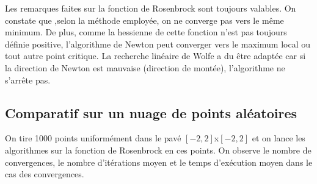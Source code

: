 \documentclass[a4paper,10pt]{article}
\begin{document}
\begin{figure}[h!]
	\centering
\end{figure}

Les remarques faites sur la fonction de Rosenbrock sont toujours valables.
On constate que ,selon la méthode employée, on ne converge pas vers le même minimum.
De plus, comme la hessienne de cette fonction n'est pas toujours définie positive, l'algorithme de Newton peut converger vers le maximum local ou tout autre point critique. 
La recherche linéaire de Wolfe a du être adaptée car si la direction de Newton est mauvaise (direction de montée), l'algorithme ne s'arrête pas.  


\newpage
\subsection{Comparatif sur un nuage de points aléatoires}
\vspace{0.5cm}
 
 
\hspace{0.4cm}
On tire 1000 points uniformément dans le pavé $[-2,2]$x$[-2,2]$ et on lance les algorithmes sur la fonction de Rosenbrock en ces points.
On observe le nombre de convergences, le nombre d'itérations moyen et le temps d'exécution moyen dans le cas des convergences.
\end{document}
